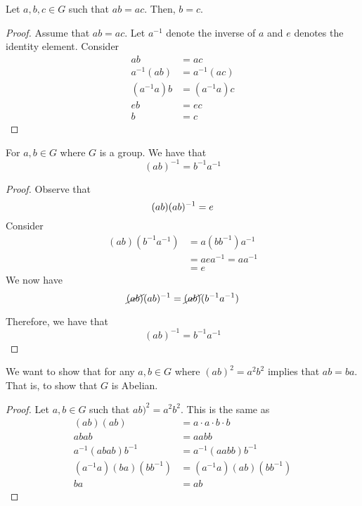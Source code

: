 \begin{theorem}[Cancellation]
    Let \(a, b, c \in G\) such that \(ab = ac\). Then, \(b = c\).
\end{theorem}

\begin{proof}
    Assume that \(ab = ac\). Let \(a^{-1}\) denote the inverse of \(a\) and \(e\) denotes the identity element. Consider
    \[
    \begin{aligned}
        ab &= ac \\
        a^{-1}(ab) &= a^{-1}(ac) \\
        (a^{-1}a)b &= (a^{-1}a)c \\
        eb &= ec \\
        b &= c
    \end{aligned}
    \]
\end{proof}

\begin{theorem}
    For \(a, b \in G\) where \(G\) is a group. We have that
    \[
        (ab)^{-1} = b^{-1}a^{-1}
    \]
\end{theorem}

\begin{proof}
    Observe that
    \[
        (ab)(ab)^{-1} = e \\
    \]
    Consider
    \[
    \begin{aligned}
        (ab)(b^{-1}a^{-1}) &= a(bb^{-1})a^{-1} \\
                           &= aea^{-1} = aa^{-1} \\
                           &= e
    \end{aligned}
    \]
    We now have
    \[
        \cancel{(ab)}(ab)^{-1} = \cancel{(ab)}(b^{-1}a^{-1})
    \]

    Therefore, we have that
    \[
        (ab)^{-1} = b^{-1}a^{-1}
    \]
\end{proof}

\begin{nexample}
    We want to show that for any \(a, b \in G\) where \((ab)^2 = a^2b^2\) implies that \(ab = ba\). That is, to show that \(G\) is Abelian.

    \begin{proof}
        Let \(a, b \in G\) such that \(ab)^2 = a^2 b^2\). This is the same as
        \[
        \begin{aligned}
            (ab)(ab) &= a \cdot a \cdot b \cdot b \\
            abab &= aabb \\
            a^{-1}(abab)b^{-1} &= a^{-1}(aabb)b^{-1} \\
            (a^{-1}a)(ba)(bb^{-1}) &= (a^{-1}a)(ab)(bb^{-1}) \\
            ba &= ab
        \end{aligned}
        \]
    \end{proof}
\end{nexample}
